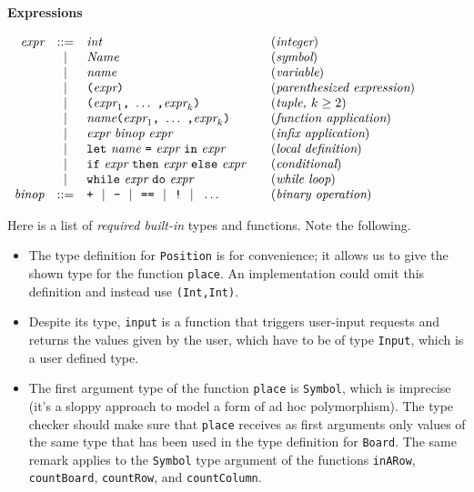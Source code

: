 \documentclass[11pt]{article}
\makeatletter
\def\denseitems{
  \itemsep1pt plus1pt minus1pt
  \parsep0pt plus0pt
  \parskip0pt\topsep0pt}
\newcommand{\prodName}[1]{&(\emph{#1})\\}
\newcommand{\nt}[1]{\textit{#1}}
\newcommand{\prog}[1]{\texttt{#1}}
\newcommand{\ORil}{\ \ |\ \ }
\newcommand{\IS}{&::=&}
\newcommand{\OR}{&|&}
\newcommand{\syntax}[2]{
  \needspace{3\baselineskip}
  \bigskip\par\noindent\textbf{#1}\par\smallskip%
  $\begin{array}{rcl@{\qquad}l}#2\end{array}$%
  \par\bigskip\noindent\ignorespaces
}
\newcommand{\lp}{\prog{(}}
\newcommand{\rp}{\prog{)}}
\newcommand{\paren}[1]{\lp#1\rp}
\makeatother
\begin{document}
\syntax{Expressions}{
\nt{expr}     \IS  \nt{int}                                 \prodName{integer}
              \OR  \nt{Name}                                 \prodName{symbol}
              \OR  \nt{name}                               \prodName{variable}
              \OR  \paren{\nt{expr}}       \prodName{parenthesized expression}
              \OR  \paren{\nt{expr}_1\prog{,}\ \ldots\ \prog{,}\nt{expr}_k}
                                                    \prodName{tuple, $k\geq 2$}
              \OR  \nt{name}\paren{\nt{expr}_1\prog{,}\ \ldots\
                                              \prog{,}\nt{expr}_k}
                                               \prodName{function application}
              \OR  \nt{expr}\ \nt{binop}\ \nt{expr}
                                                  \prodName{infix application}
             \OR  \prog{let}\ \nt{name}\ \prog{=}\ \nt{expr}\
                   \prog{in}\ \nt{expr}            \prodName{local definition}
              \OR  \prog{if}\ \nt{expr}\ \prog{then}\ \nt{expr}\
                   \prog{else}\ \nt{expr}               \prodName{conditional}
              \OR  \prog{while}\ \nt{expr}\ \prog{do}\ \nt{expr}
                                                         \prodName{while loop}
%
\nt{binop}    \IS  \prog{+} \ORil \prog{-} \ORil
                   \prog{==} \ORil \prog{!} \ORil \ldots
                                                   \prodName{binary operation}
}
%
Here is a list of \emph{required built-in} types and functions.
%
Note the following.
%
\begin{itemize}\denseitems
%
\item The type definition for \prog{Position} is for convenience; it allows us
to give the shown type for the function \prog{place}. An implementation could
omit this definition and instead use \prog{(Int,Int)}.
%
\item Despite its type, \prog{input} is a function that triggers user-input
requests and returns the values given by the user, which have to be of type
\prog{Input}, which is a user defined type.
%
\item The first argument type of the function \prog{place} is \prog{Symbol},
which is imprecise (it's a sloppy approach to model a form of ad hoc
polymorphism). The type checker should make sure that \prog{place} receives as
first arguments only values of the same type that has been used in the type
definition for \prog{Board}.
%
The same remark applies to the \prog{Symbol} type argument of the functions
\prog{inARow}, \prog{countBoard}, \prog{countRow}, and \prog{countColumn}.
%
\end{itemize}
\end{document}
